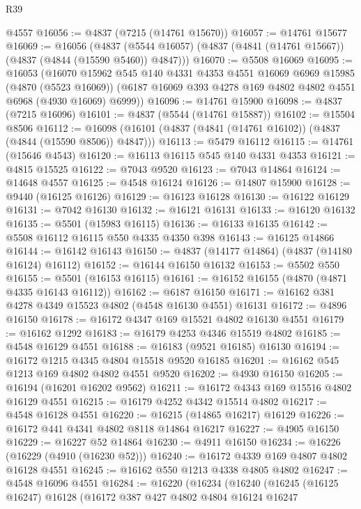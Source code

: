 \begin{lexlean}{R39}
\begin{coremodule}
    @4557
@16056 := @4837 (@7215 (@14761 @15670))
@16057 := @14761 @15677
@16069 := @16056
    (@4837 (@5544 @16057) (@4837 (@4841 (@14761 @15667)) (@4837 (@4844 (@15590 @5460)) @4847)))
@16070 := @5508 @16069
@16095 := @16053
    (@16070
      @15962
      @545
      @140
      @4331
      @4353
      @4551
      @16069
      @6969
      @15985
      (@4870 (@5523 @16069))
      (@6187 @16069 @393 @4278 @169 @4802 @4802 @4551 @6968 (@4930 @16069) @6999))
@16096 := @14761 @15900
@16098 := @4837 (@7215 @16096)
@16101 := @4837 (@5544 (@14761 @15887))
@16102 := @15504 @8506
@16112 := @16098 (@16101 (@4837 (@4841 (@14761 @16102)) (@4837 (@4844 (@15590 @8506)) @4847)))
@16113 := @5479 @16112
@16115 := @14761 (@15646 @4543)
@16120 := @16113 @16115 @545 @140 @4331 @4353
@16121 := @4815 @15525
@16122 := @7043 @9520
@16123 := @7043 @14864
@16124 := @14648 @4557
@16125 := @4548 @16124
@16126 := @14807 @15900
@16128 := @9440 (@16125 @16126)
@16129 := @16123 @16128
@16130 := @16122 @16129
@16131 := @7042 @16130
@16132 := @16121 @16131
@16133 := @16120 @16132
@16135 := @5501 (@15983 @16115)
@16136 := @16133 @16135
@16142 := @5508 @16112 @16115 @550 @4335 @4350 @398
@16143 := @16125 @14866
@16144 := @16142 @16143
@16150 := @4837 (@14177 @14864) (@4837 (@14180 @16124) @16112)
@16152 := @16144 @16150 @16132
@16153 := @5502 @550
@16155 := @5501 (@16153 @16115)
@16161 := @16152 @16155 (@4870 (@4871 @4335 @16143 @16112))
@16162 := @6187 @16150
@16171 := @16162 @381 @4278 @4349 @15523 @4802 (@4548 @16130 @4551) @16131
@16172 := @4896 @16150
@16178 := @16172 @4347 @169 @15521 @4802 @16130 @4551
@16179 := @16162 @1292
@16183 := @16179 @4253 @4346 @15519 @4802
@16185 := @4548 @16129 @4551
@16188 := @16183 (@9521 @16185) @16130
@16194 := @16172 @1215 @4345 @4804 @15518 @9520 @16185
@16201 := @16162 @545 @1213 @169 @4802 @4802 @4551 @9520
@16202 := @4930 @16150
@16205 := @16194 (@16201 @16202 @9562)
@16211 := @16172 @4343 @169 @15516 @4802 @16129 @4551
@16215 := @16179 @4252 @4342 @15514 @4802
@16217 := @4548 @16128 @4551
@16220 := @16215 (@14865 @16217) @16129
@16226 := @16172 @441 @4341 @4802 @8118 @14864 @16217
@16227 := @4905 @16150
@16229 := @16227 @52 @14864
@16230 := @4911 @16150
@16234 := @16226 (@16229 (@4910 (@16230 @52)))
@16240 := @16172 @4339 @169 @4807 @4802 @16128 @4551
@16245 := @16162 @550 @1213 @4338 @4805 @4802
@16247 := @4548 @16096 @4551
@16284 := @16220
    (@16234
      (@16240
        (@16245
          (@16125 @16247)
          @16128
          (@16172
            @387
            @427
            @4802
            @4804
            @16124
            @16247

\end{coremodule}
\end{lexlean}
